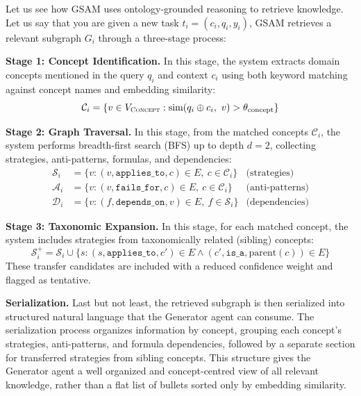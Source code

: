 \documentclass[12pt,a4paper,oneside]{article}
\begin{document}
Let us see how GSAM uses ontology-grounded reasoning to retrieve knowledge. Let us say that you are given a new task $t_i = (c_i, q_i, y_i)$, GSAM retrieves a relevant subgraph $G_i$ through a three-stage process:

\textbf{Stage 1: Concept Identification.} In this stage, the system extracts domain concepts mentioned in the query $q_i$ and context $c_i$ using both keyword matching against concept names and embedding similarity:
\begin{equation}
\mathcal{C}_i = \{v \in V_{\textsc{Concept}} : \text{sim}(q_i \oplus c_i,\ v) > \theta_{\text{concept}}\}
\end{equation}

\textbf{Stage 2: Graph Traversal.} In this stage, from the matched concepts $\mathcal{C}_i$, the system performs breadth-first search (BFS) up to depth $d = 2$, collecting strategies, anti-patterns, formulas, and dependencies:
\begin{align}
\mathcal{S}_i &= \{v : (v, \texttt{applies\_to}, c) \in E,\ c \in \mathcal{C}_i\} & \text{(strategies)} \\
\mathcal{A}_i &= \{v : (v, \texttt{fails\_for}, c) \in E,\ c \in \mathcal{C}_i\} & \text{(anti-patterns)} \\
\mathcal{D}_i &= \{v : (f, \texttt{depends\_on}, v) \in E,\ f \in \mathcal{S}_i\} & \text{(dependencies)}
\end{align}

\textbf{Stage 3: Taxonomic Expansion.} In this stage, for each matched concept, the system includes strategies from taxonomically related (sibling) concepts:
\begin{equation}
\mathcal{S}_i^+ = \mathcal{S}_i \cup \{s : (s, \texttt{applies\_to}, c') \in E \land (c', \texttt{is\_a}, \text{parent}(c)) \in E\}
\end{equation}
These transfer candidates are included with a reduced confidence weight and flagged as tentative.

\textbf{Serialization.} Last but not least, the retrieved subgraph is then serialized into structured natural language that the Generator agent can consume. The serialization process organizes information by concept, grouping each concept's strategies, anti-patterns, and formula dependencies, followed by a separate section for transferred strategies from sibling concepts. This structure gives the Generator agent a well organized and concept-centred view of all relevant knowledge, rather than a flat list of bullets sorted only by embedding similarity.
\end{document}
